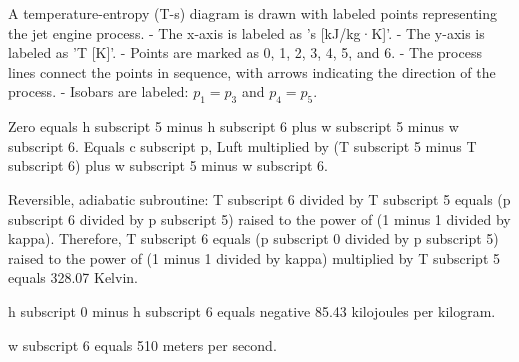 A temperature-entropy (T-s) diagram is drawn with labeled points representing the jet engine process.  
- The x-axis is labeled as 's [kJ/kg·K]'.  
- The y-axis is labeled as 'T [K]'.  
- Points are marked as 0, 1, 2, 3, 4, 5, and 6.  
- The process lines connect the points in sequence, with arrows indicating the direction of the process.  
- Isobars are labeled: \( p_1 = p_3 \) and \( p_4 = p_5 \).

Zero equals h subscript 5 minus h subscript 6 plus w subscript 5 minus w subscript 6.  
Equals c subscript p, Luft multiplied by (T subscript 5 minus T subscript 6) plus w subscript 5 minus w subscript 6.  

Reversible, adiabatic subroutine:  
T subscript 6 divided by T subscript 5 equals (p subscript 6 divided by p subscript 5) raised to the power of (1 minus 1 divided by kappa).  
Therefore, T subscript 6 equals (p subscript 0 divided by p subscript 5) raised to the power of (1 minus 1 divided by kappa) multiplied by T subscript 5 equals 328.07 Kelvin.  

h subscript 0 minus h subscript 6 equals negative 85.43 kilojoules per kilogram.  

w subscript 6 equals 510 meters per second.